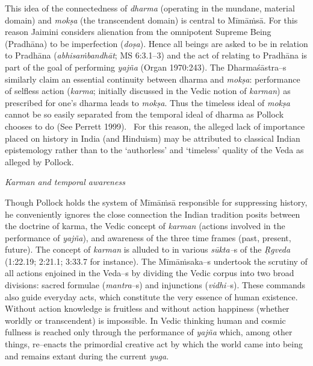 This idea of the connectedness of \textit{dharma} (operating in the mundane, material domain) and \textit{mokṣa} (the transcendent domain) is central to Mīmāṁsā. For this reason Jaimini considers alienation from the omnipotent Supreme Being (Pradhāna) to be imperfection (\textit{doṣa}). Hence all beings are asked to be in relation to Pradhāna (\textit{abhisaṁbandhāt}; MS 6:3.1–3) and the act of relating to Pradhāna is part of the goal of performing \textit{yajña} (Organ 1970:243). The Dharmaśāstra–s similarly claim an essential continuity between dharma and \textit{mokṣa}: performance of selfless action (\textit{karma}; initially discussed in the Vedic notion of \textit{karman}) as prescribed for one's dharma leads to \textit{mokṣa}. Thus the timeless ideal of \textit{mokṣa} cannot be so easily separated from the temporal ideal of dharma as Pollock chooses to do (See Perrett 1999).  For this reason, the alleged lack of importance placed on history in India (and Hinduism) may be attributed to classical Indian epistemology rather than to the ‘authorless’ and ‘timeless’ quality of the Veda as alleged by Pollock.

\textit{Karman and temporal awareness}

Though Pollock holds the system of Mīmāṁsā responsible for suppressing history, he conveniently ignores the close connection the Indian tradition posits between the doctrine of karma, the Vedic concept of \textit{karman} (actions involved in the performance of \textit{yajña}), and awareness of the three time frames (past, present, future). The concept of \textit{karman} is alluded to in various \textit{sūkta–}s of the \textit{Ṛgveda} (1:22.19; 2:21.1; 3:33.7 for instance). The Mīmāṁsaka–s undertook the scrutiny of all actions enjoined in the Veda–s by dividing the Vedic corpus into two broad divisions: sacred formulae (\textit{mantra}–s) and injunctions (\textit{vidhi–}s). These commands also guide everyday acts, which constitute the very essence of human existence. Without action knowledge is fruitless and without action happiness (whether worldly or transcendent) is impossible. In Vedic thinking human and cosmic fullness is reached only through the performance of \textit{yajña} which, among other things, re–enacts the primordial creative act by which the world came into being and remains extant during the current \textit{yuga}.

